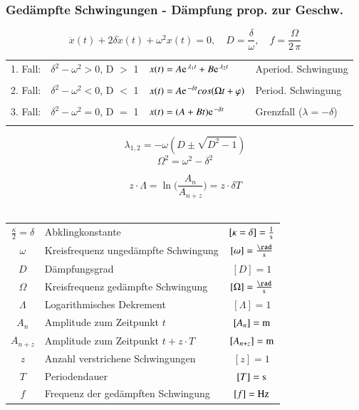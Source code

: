 \subsubsection{Gedämpfte Schwingungen - Dämpfung prop. zur Geschw.}
$$ \boxed{\ddot{x}(t) + 2\delta \dot{x}(t) + \omega^2x(t) = 0, \quad D = \frac{\delta}{\omega}, \quad f = \frac{\Omega}{2 \, \pi}} $$
\tiny
\setlength{\tabcolsep}{3pt}
\begin{tabular}{|l|c|l|l|}\hline
        1. Fall: & $\delta^2 - \omega^2 > 0$, D $>$ 1 & $ x(t) = A \e^{\lambda_1t} + B\e^{\lambda_2t} $ & Aperiod. Schwingung \\ 
        & & & \\ \hline
        2. Fall: & $\delta^2 - \omega^2 < 0$, D $<$ 1 & $ x(t) = A \e^{-\delta t} cos(\Omega t + \varphi) $ & Period. Schwingung \\
        & & & \\\hline
        3. Fall: & $\delta^2 - \omega^2 = 0$, D $=$ 1 & $ x(t) = (A + Bt)\e^{-\delta t} $ & Grenzfall ($\lambda = -\delta$) \\
        & & & \\\hline
\end{tabular}
\normalsize



\begin{minipage}{0.5\linewidth}
    $$ \boxed{ \lambda_{1,2} = -\omega ( D \pm \sqrt{D^2 -1}) }$$ 
    $$ \boxed{ \Omega^2 =  \omega^2 - \delta^2 }$$ 
\end{minipage}
\hfill
\begin{minipage}{0.45\linewidth}
    $$ \boxed{ z \cdot \Lambda = \ln \Big( \frac{A_n}{A_{n+z}} \Big) = z \cdot \delta T }$$ \\
\end{minipage}

\begin{tabular}{c l c}
$\frac{\kappa}{2} = \delta$ & Abklingkonstante & $[\kappa = \delta] = \frac{1}{\mathrm{s}}$ \\
$\omega$ & Kreisfrequenz ungedämpfte Schwingung & $[\omega] = \frac{\rad}{\s}$ \\
$D$ & Dämpfungsgrad & $[D] = 1$ \\
$\Omega$ & Kreisfrequenz gedämpfte Schwingung & $[\Omega] = \frac{\rad}{\s}$ \\


$\Lambda$ & Logarithmisches Dekrement & $[\Lambda] = 1$ \\
$A_n$ & Amplitude zum Zeitpunkt $t$ & $[A_n] = \mathrm{m}$ \\
$A_{n+z}$ & Amplitude zum Zeitpunkt $t + z \cdot T$ & $[A_{n+z}] = \mathrm{m}$ \\
$z$ & Anzahl verstrichene Schwingungen & $[z] = 1$ \\
$T$ & Periodendauer & $[T] = \mathrm{s}$ \\
$f$ & Frequenz der gedämpften Schwingung & $[f] = \mathrm{Hz}$ 
\end{tabular}



